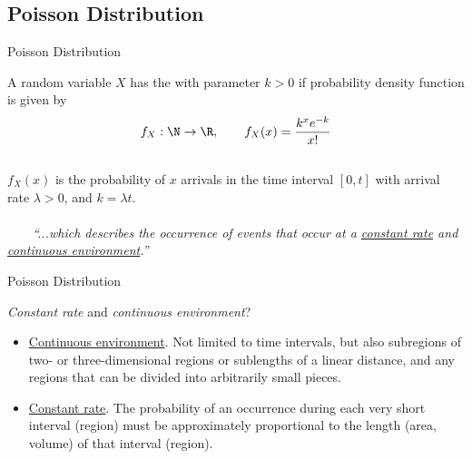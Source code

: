 \subsection{Poisson Distribution}

\begin{frame}{Poisson Distribution}

\justifying
{} A random variable $X$ has the  with parameter $k > 0$ if probability density function is given by
\begin{align*}
f_X: \N \rightarrow \R, \qquad f_X(x) = \frac{k^xe^{-k}}{x!}
\end{align*}
~\\
 $f_X(x)$ is the probability of $x$ arrivals in the time interval $[0, t]$ with arrival rate $\lambda > 0$, and $k = \lambda t$. \\
~\\
~~~~\emph{``...which describes the occurrence of events that occur at a \underline{constant rate} and \underline{continuous environment}.''} \\

\end{frame}

\begin{frame}{Poisson Distribution}

 \emph{Constant rate} and \emph{continuous environment}?
\begin{itemize}
	\justifying
	\item \underline{Continuous environment}. Not limited to time intervals, but also subregions of two- or three-dimensional regions or sublengths of a linear distance, and any regions that can be divided into arbitrarily small pieces.
	\item \underline{Constant rate}. The probability of an occurrence during each very short interval (region) must be approximately proportional to the length (area, volume) of that interval (region).
\end{itemize}

\end{frame}

